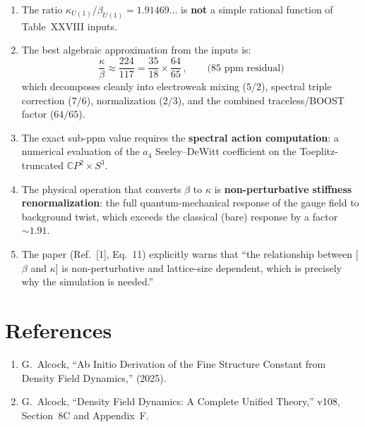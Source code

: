 \documentclass[12pt,a4paper]{article}
\begin{document}
\begin{enumerate}
\item The ratio $\kappa_{U(1)}/\beta_{U(1)} = 1.91469\ldots$ is
  \textbf{not} a simple rational function of Table~XXVIII inputs.

\item The best algebraic approximation from the inputs is:
\begin{equation}
\frac{\kappa}{\beta} \approx \frac{224}{117}
= \frac{35}{18} \times \frac{64}{65}\,,
\qquad\text{(85~ppm residual)}
\end{equation}
  which decomposes cleanly into electroweak mixing ($5/2$), spectral
  triple correction ($7/6$), normalization ($2/3$), and the combined
  traceless/BOOST factor ($64/65$).

\item The exact sub-ppm value requires the \textbf{spectral action
  computation}: a numerical evaluation of the $a_4$ Seeley--DeWitt
  coefficient on the Toeplitz-truncated $\mathbb{C}P^2 \times S^3$.

\item The physical operation that converts $\beta$ to $\kappa$ is
  \textbf{non-perturbative stiffness renormalization}: the full
  quantum-mechanical response of the gauge field to background twist,
  which exceeds the classical (bare) response by a factor $\sim 1.91$.

\item The paper (Ref.~[1], Eq.~11) explicitly warns that ``the
  relationship between [$\beta$ and $\kappa$] is non-perturbative and
  lattice-size dependent, which is precisely why the simulation is needed.''
\end{enumerate}

\section*{References}

\begin{enumerate}
\item[{[1]}] G.~Alcock, ``Ab Initio Derivation of the Fine Structure Constant
  from Density Field Dynamics,'' (2025).

\item[{[2]}] G.~Alcock, ``Density Field Dynamics: A Complete Unified Theory,''
  v108, Section~8C and Appendix~F.
\end{enumerate}
\end{document}

